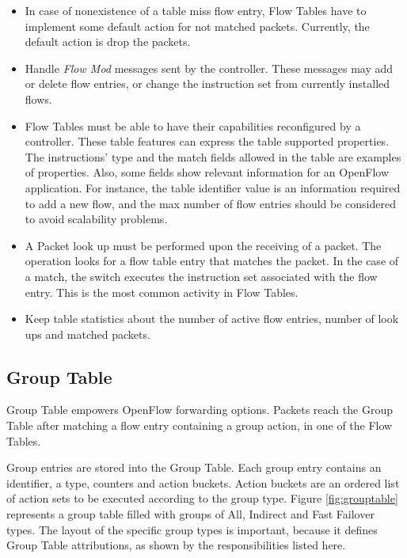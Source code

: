 	\begin{itemize}

    \item In case of nonexistence of a table miss flow entry, Flow Tables have to implement some default action for not matched packets. Currently, the default action is drop the packets. 

	\item Handle \textit{Flow Mod} messages sent by the controller. These messages may add or delete flow entries, or change the instruction set from currently installed flows.  

	\item Flow Tables must be able to have their capabilities reconfigured by a controller. These table features can express the table supported properties. The instructions' type and the match fields allowed in the table are examples of properties. Also, some fields show relevant information for an OpenFlow application. For instance, the table identifier value is an information required to add a new flow, and the max number of flow entries should be considered to avoid scalability problems.           

    \item A Packet look up must be performed upon the receiving of a packet. The operation looks for a flow table entry that matches the packet. In the case of a match, the switch executes the instruction set associated with the flow entry. This is the most common activity in Flow Tables.   
    
    \item Keep table statistics about the number of active flow entries, number of look ups and matched packets.  

	\end{itemize}

	\subsection{Group Table}

	Group Table empowers OpenFlow forwarding options. Packets reach the Group Table after matching a flow entry containing a group action, in one of the Flow Tables. 
	
	Group entries are stored into the Group Table. Each group entry contains an identifier, a type, counters and action buckets. Action buckets are an ordered list of action sets to be executed according to the group type. Figure \ref{fig:grouptable} represents a group table filled with groups of All, Indirect and Fast Failover types. The layout of the specific group types is important, because it defines Group Table attributions, as shown by the responsibilities listed here.
	
